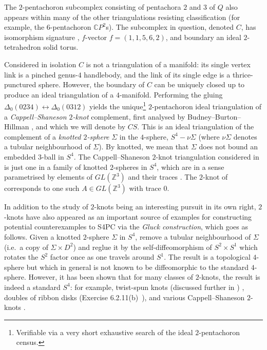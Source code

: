 \documentclass[pdflatex,sn-mathphys-num]{sn-jnl}
\theoremstyle{thmstyleone}%
\theoremstyle{thmstyletwo}%
\theoremstyle{thmstylethree}%
\newcommand{\is}[1]{{\ttfamily\seqsplit{#1}}} %
\theoremstyle{remark}
\begin{document}
The $2$-pentachoron subcomplex consisting of pentachora $2$ and $3$ of $Q$ also appears within many of the other triangulations resisting classification (for example, the $6$-pentachoron $\mathbb{C}P^2$s). The subcomplex in question, denoted $C$, has isomorphism signature \is{cHIbbb0bRbpb}, $f$-vector $f=(1,1,5,6,2)$, and boundary an ideal $2$-tetrahedron solid torus. 

Considered in isolation $C$ is not a triangulation of a manifold: its single vertex link is a pinched genus-$4$ handlebody, and the link of its single edge is a thrice-punctured sphere. However, the boundary of $C$ can be uniquely closed up to produce an ideal triangulation of a $4$-manifold. Performing the gluing $\Delta_0(0234)\leftrightarrow\Delta_0(0312)$ yields  the unique\footnote{Verifiable via a very short exhaustive search of the ideal $2$-pentachoron census.} $2$-pentachoron ideal triangulation of a \emph{Cappell--Shaneson $2$-knot} complement, first analysed by Budney--Burton--Hillman \cite{budneyBurtonHillman-CappellShanesonComp}, and which we will denote by $CS$. This is an ideal triangulation of the complement of a \emph{knotted $2$-sphere} $\Sigma$ in the $4$-sphere, $S^4-\nu \Sigma$ (where $\nu\Sigma$ denotes a tubular neighbourhood of $\Sigma$). By knotted, we mean that $\Sigma$ does not bound an embedded $3$-ball in $S^4$. The Cappell--Shaneson $2$-knot triangulation considered in \cite{budneyBurtonHillman-CappellShanesonComp} is just one in a family of knotted $2$-spheres in $S^4$, which are in a sense parametrised by elements of $GL(\mathbb{Z}^3)$ and their traces \cite{CappellShaneson}. The $2$-knot of \cite{budneyBurtonHillman-CappellShanesonComp} corresponds to one such $A\in GL(\mathbb{Z}^3)$ with trace $0$.
 
In addition to the study of $2$-knots being an interesting pursuit in its own right, $2$-knots have also appeared as an important source of examples for constructing potential counterexamples to S4PC via the \emph{Gluck construction}, which goes as follows. Given a knotted $2$-sphere $\Sigma$ in $S^4$, remove a tubular neighbourhood of $\Sigma$ (i.e.\ a copy of $\Sigma\times D^2$) and reglue it by the self-diffeomorphism of $S^2\times S^1$ which rotates the $S^2$ factor once as one travels around $S^1$. The result is a topological $4$-sphere but which in general is not known to be diffeomorphic to the standard $4$-sphere. However, it has been shown that for many classes of $2$-knots, the result is indeed a standard $S^4$: for example, twist-spun knots (discussed further in ) \cite{Gordon-KnotsInS4,Pao-TwistingSpunKnots},
doubles of ribbon disks (Exercise 6.2.11(b)~\cite{GompfStipsicz}), and various Cappell--Shaneson $2$-knots \cite{akbulut-csSpheresAreStandard,Gompf-KillingAkbulutKirbySphere,Gompf-csSpheresAreStandard,Iwaki-CSspheresAreStandard}.
\end{document}
